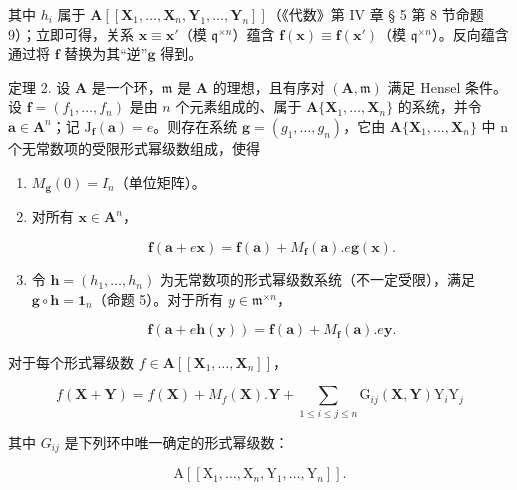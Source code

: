 其中 \(h_i\) 属于 \(\mathbf{A}[[\mathbf{X}_1,\ldots,\mathbf{X}_n,\mathbf{Y}_1,\ldots,\mathbf{Y}_n]]\)（《代数》第 IV 章 § 5 第 8 节命题 9）；立即可得，关系 \(\mathbf{x} \equiv \mathbf{x}'\)（模 \(\mathfrak{q}^{\times n}\)）蕴含 \(\mathbf{f}(\mathbf{x}) \equiv \mathbf{f}(\mathbf{x}')\)（模 \(\mathfrak{q}^{\times n}\)）。反向蕴含通过将 \(\mathbf{f}\) 替换为其“逆”\(\mathbf{g}\) 得到。

定理 2. 设 \(\mathbf{A}\) 是一个环，\(\mathfrak{m}\) 是 \(\mathbf{A}\) 的理想，且有序对 \((\mathbf{A},\mathfrak{m})\) 满足 Hensel 条件。设 \(\mathbf{f} = (f_1,\ldots ,f_n)\) 是由 \(n\) 个元素组成的、属于 \(\mathbf{A}\{\mathbf{X}_1,\ldots ,\mathbf{X}_n\}\) 的系统，并令 \(\mathbf{a}\in \mathbf{A}^n\)；记 \(\mathrm{J}_{\mathbf{f}}(\mathbf{a}) = e\)。则存在系统 \(\mathbf{g} = (g_1,\dots ,g_n)\)，它由 \(\mathbf{A}\{\mathbf{X}_1,\dots ,\mathbf{X}_n\}\) 中 n 个无常数项的受限形式幂级数组成，使得

\begin{enumerate}
\def\labelenumi{(\roman{enumi})}
\item
  \(M_{\mathbf{g}}(0) = I_{n}\)（单位矩阵）。
\item
  对所有 \(\mathbf{x} \in \mathbf{A}^n\)，

\[
\mathbf {f} (\mathbf {a} + e \mathbf {x}) = \mathbf {f} (\mathbf {a}) + M _ {\mathbf {f}} (\mathbf {a}). e \mathbf {g} (\mathbf {x}).\tag{19}
\]

\item
  令 \(\mathbf{h} = (h_1, \ldots, h_n)\) 为无常数项的形式幂级数系统（不一定受限），满足 \(\mathbf{g} \circ \mathbf{h} = \mathbf{1}_n\)（命题 5）。对于所有 \(y \in \mathfrak{m}^{\times n}\)，

\[
\mathbf {f} (\mathbf {a} + e \mathbf {h} (\mathbf {y})) = \mathbf {f} (\mathbf {a}) + M _ {\mathbf {f}} (\mathbf {a}). e \mathbf {y}.\tag{20}
\]

\end{enumerate}

对于每个形式幂级数 \(f \in \mathbf{A}[[\mathbf{X}_1, \ldots, \mathbf{X}_n]]\)，

\[
f (\mathbf {X} + \mathbf {Y}) = f (\mathbf {X}) + M _ {f} (\mathbf {X}). \mathbf {Y} + \sum_ {1 \leqslant i \leqslant j \leqslant n} \mathrm{G} _ {i j} (\mathbf {X}, \mathbf {Y}) \mathrm{Y} _ {i} \mathrm{Y} _ {j}\tag{21}
\]

其中 \(G_{ij}\) 是下列环中唯一确定的形式幂级数：

\[
\mathrm{A} \left[ \left[ \mathrm{X} _ {1}, \dots , \mathrm{X} _ {n}, \mathrm{Y} _ {1}, \dots , \mathrm{Y} _ {n} \right] \right].
\]

